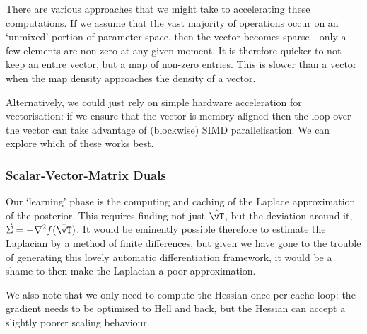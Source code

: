             \begin{aside}
                There are various approaches that we might take to accelerating these computations. If we assume that the vast majority of operations occur on an `unmixed' portion of parameter space, then the vector becomes sparse - only a few elements are non-zero at any given moment. It is therefore quicker to not keep an entire vector, but a map of non-zero entries. This is slower than a vector when the map density approaches the density of a vector. 

                Alternatively, we could just rely on simple hardware acceleration for vectorisation: if we ensure that the vector is memory-aligned then the loop over the vector can take advantage of (blockwise) SIMD parallelisation. We can explore which of these works best.
            \end{aside}

        \subsubsection{Scalar-Vector-Matrix Duals}

            Our `learning' phase is the computing and caching of the Laplace approximation of the posterior. This requires finding not just $\hat{\vT}$, but the deviation around it, $\vec{\Sigma} = -\nabla^2 f(\hat{\vT})$. It would be eminently possible therefore to estimate the Laplacian by a method of finite differences, but given we have gone to the trouble of generating this lovely automatic differentiation framework, it would be a shame to then make the Laplacian a poor approximation. 

            We also note that we only need to compute the Hessian once per cache-loop: the gradient needs to be optimised to Hell and back, but the Hessian can accept a slightly poorer scaling behaviour. 

